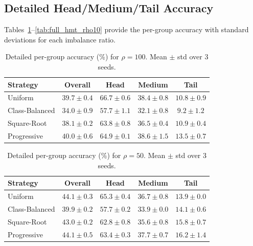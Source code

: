 \documentclass[12pt,a4paper]{article}
\begin{document}
\subsection{Detailed Head/Medium/Tail Accuracy}

Tables~\ref{tab:full_hmt_rho100}--\ref{tab:full_hmt_rho10} provide the per-group accuracy with standard deviations for each imbalance ratio.

\begin{table}[H]
    \centering
    \caption{Detailed per-group accuracy (\%) for $\rho = 100$. Mean $\pm$ std over 3 seeds.}
    \label{tab:full_hmt_rho100}
    \begin{tabular}{lcccc}
        \toprule
        \textbf{Strategy} & \textbf{Overall} & \textbf{Head} & \textbf{Medium} & \textbf{Tail} \\
        \midrule
        Uniform        & $39.7 \pm 0.4$ & $\mathbf{66.7 \pm 0.6}$ & $38.4 \pm 0.8$ & $10.8 \pm 0.9$ \\
        Class-Balanced & $34.0 \pm 0.9$ & $57.7 \pm 1.1$ & $32.1 \pm 0.8$ & $9.2 \pm 1.2$ \\
        Square-Root    & $38.1 \pm 0.2$ & $63.8 \pm 0.8$ & $36.5 \pm 0.4$ & $10.9 \pm 0.4$ \\
        Progressive    & $\mathbf{40.0 \pm 0.6}$ & $64.9 \pm 0.1$ & $\mathbf{38.6 \pm 1.5}$ & $\mathbf{13.5 \pm 0.7}$ \\
        \bottomrule
    \end{tabular}
\end{table}

\begin{table}[H]
    \centering
    \caption{Detailed per-group accuracy (\%) for $\rho = 50$. Mean $\pm$ std over 3 seeds.}
    \label{tab:full_hmt_rho50}
    \begin{tabular}{lcccc}
        \toprule
        \textbf{Strategy} & \textbf{Overall} & \textbf{Head} & \textbf{Medium} & \textbf{Tail} \\
        \midrule
        Uniform        & $44.1 \pm 0.3$ & $\mathbf{65.3 \pm 0.4}$ & $36.7 \pm 0.8$ & $13.9 \pm 0.0$ \\
        Class-Balanced & $39.9 \pm 0.2$ & $57.7 \pm 0.2$ & $33.9 \pm 0.0$ & $14.1 \pm 0.6$ \\
        Square-Root    & $43.0 \pm 0.2$ & $62.8 \pm 0.8$ & $35.6 \pm 0.8$ & $15.8 \pm 0.7$ \\
        Progressive    & $\mathbf{44.1 \pm 0.5}$ & $63.4 \pm 0.3$ & $\mathbf{37.7 \pm 0.7}$ & $\mathbf{16.2 \pm 1.4}$ \\
        \bottomrule
    \end{tabular}
\end{table}
\end{document}
